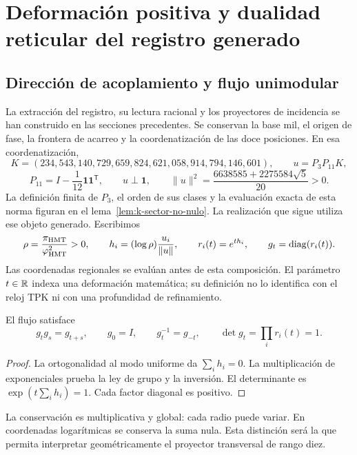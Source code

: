 \section{Deformación positiva y dualidad reticular del registro generado}
\label{rec:positiva}

\subsection{Dirección de acoplamiento y flujo unimodular}

La extracción del registro, su lectura racional y los proyectores de incidencia se han construido en las secciones precedentes. Se conservan la base mil, el origen de fase, la frontera de acarreo y la coordenatización de las doce posiciones. En esa coordenatización,
\[
 K=(234,543,140,729,659,824,621,058,914,794,146,601),
 \qquad u=P_3P_{11}K,
\]
\[
 P_{11}=I-\frac1{12}\mathbf1\mathbf1^{\mathsf T},\qquad
 u\perp\mathbf1,\qquad
 \|u\|^2=\frac{6638585+2275584\sqrt5}{20}>0.
\]
La definición finita de \(P_3\), el orden de sus clases y la evaluación exacta de esta norma figuran en el lema~\ref{lem:k-sector-no-nulo}. La realización que sigue utiliza ese objeto generado. Escribimos
\begin{equation}
 \rho=\frac{\pi_{\mathrm{HMT}}}{\varphi_{\mathrm{HMT}}^2}>0,\qquad
 h_i=(\log\rho)\frac{u_i}{\|u\|},\qquad
 r_i(t)=e^{th_i},\qquad g_t=\operatorname{diag}(r_i(t)).
 \label{rec:eq:flujo}
\end{equation}
Las coordenadas regionales se evalúan antes de esta composición. El parámetro \(t\in\mathbb R\) indexa una deformación matemática; su definición no lo identifica con el reloj TPK ni con una profundidad de refinamiento.

\begin{proposition}
\label{rec:prop:flujo}
El flujo satisface
\[
 g_tg_s=g_{t+s},\qquad g_0=I,\qquad g_t^{-1}=g_{-t},\qquad
 \det g_t=\prod_i r_i(t)=1.
\]
\end{proposition}
\begin{proof}
La ortogonalidad al modo uniforme da \(\sum_i h_i=0\). La multiplicación de exponenciales prueba la ley de grupo y la inversión. El determinante es \(\exp(t\sum_i h_i)=1\). Cada factor diagonal es positivo.
\end{proof}

La conservación es multiplicativa y global: cada radio puede variar. En coordenadas logarítmicas se conserva la suma nula. Esta distinción será la que permita interpretar geométricamente el proyector transversal de rango diez.

